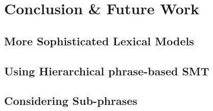 \chapter{Conclusion \& Future Work}
\label{sec:conclusion}

\section{More Sophisticated Lexical Models}

\section{Using Hierarchical phrase-based SMT}

\section{Considering Sub-phrases}












